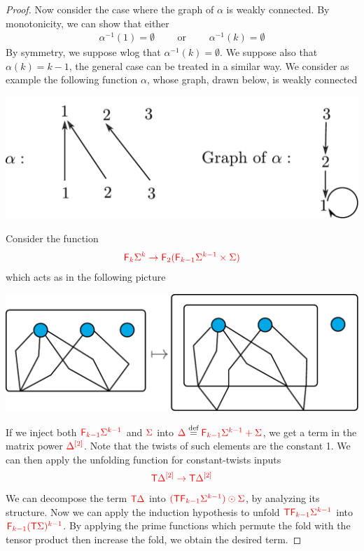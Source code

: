 \begin{proof}
Now consider the case where the graph of $\alpha$ is weakly connected. By monotonicity, we can show that either
\begin{align*}
\alpha^{-1}(1)=\emptyset\qquad\text{ or }\qquad\alpha^{-1}(k)=\emptyset
\end{align*}
By symmetry, we suppose wlog that $\alpha^{-1}(k)=\emptyset$. We suppose also that $\alpha(k)=k-1$, the general case can be treated in a similar way.
We consider as example the following function $\alpha$, whose graph, drawn below, is weakly connected
\begin{center}
\includegraphics[scale=.4]{pictures/graph-of-alpha}
\end{center}
Consider the function
\begin{align*}
{\color{red}{{\color{red}{\mathsf F_{k}}}\Sigma^k \to {\color{red}{\mathsf F_{2}}}({\color{red}{\mathsf F_{k-1}}}\Sigma^{k-1}\times\Sigma)}}
\end{align*}
which acts as in the following picture
\begin{center}
\includegraphics[scale=.4]{pictures/connected-alpha-hom}
\end{center}
If we inject both ${\color{red}{{\color{red}{\mathsf F_{k-1}}}\Sigma^{k-1}}}$ and ${\color{red}{\Sigma}}$ into ${\color{red}{\Delta}}\stackrel{\text{def}}={\color{red}{{\color{red}{\mathsf F_{k-1}}}\Sigma^{k-1}+\Sigma}}$, we get a term in the matrix power ${\color{red}{\Delta}}^{{\color{red}{[2]}}}$. Note that the twists of such elements are the constant 1. We can then apply the unfolding function for constant-twists inputs
\begin{align*}
{\color{red}{{\color{red}{\mathsf T}}\Delta^{{\color{red}{[2]}}} \to {\color{red}{\mathsf T}}\Delta^{{\color{red}{[2]}}}}}
\end{align*}
We can decompose the term ${\color{red}{\mathsf T}} {\color{red}{\Delta}}$ into  ${\color{red}{({\color{red}{\mathsf T}}{\color{red}{\mathsf F_{k-1}}}\Sigma^{k-1})\odot \Sigma}}$, by analyzing its structure. Now we can apply the induction hypothesis to unfold  ${\color{red}{{\color{red}{\mathsf T}}{\color{red}{\mathsf F_{k-1}}}\Sigma^{k-1}}}$ into ${\color{red}{{\color{red}{\mathsf F_{k-1}}}({\color{red}{\mathsf T}}\Sigma)^{k-1}}}$. By applying the prime functions which permute the fold with the tensor product then increase the fold, we obtain the desired term.
\end{proof}


